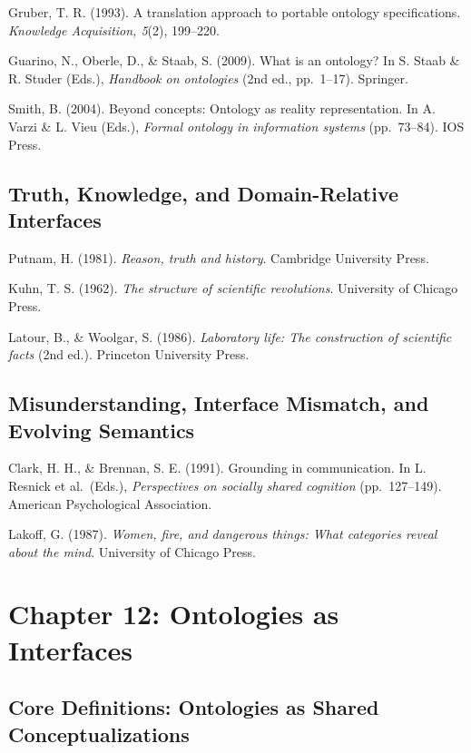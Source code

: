 \documentclass[
  openright]{book}
\begin{document}
Gruber, T. R. (1993). A translation approach to portable ontology
specifications. \emph{Knowledge Acquisition, 5}(2), 199--220.

Guarino, N., Oberle, D., \& Staab, S. (2009). What is an ontology? In S.
Staab \& R. Studer (Eds.), \emph{Handbook on ontologies} (2nd ed.,
pp.~1--17). Springer.

Smith, B. (2004). Beyond concepts: Ontology as reality representation.
In A. Varzi \& L. Vieu (Eds.), \emph{Formal ontology in information
systems} (pp.~73--84). IOS Press.

\subsection{Truth, Knowledge, and Domain-Relative
Interfaces}\label{truth-knowledge-and-domain-relative-interfaces-1}

Putnam, H. (1981). \emph{Reason, truth and history}. Cambridge
University Press.

Kuhn, T. S. (1962). \emph{The structure of scientific revolutions}.
University of Chicago Press.

Latour, B., \& Woolgar, S. (1986). \emph{Laboratory life: The
construction of scientific facts} (2nd ed.). Princeton University Press.

\subsection{Misunderstanding, Interface Mismatch, and Evolving
Semantics}\label{misunderstanding-interface-mismatch-and-evolving-semantics-1}

Clark, H. H., \& Brennan, S. E. (1991). Grounding in communication. In
L. Resnick et al.~(Eds.), \emph{Perspectives on socially shared
cognition} (pp.~127--149). American Psychological Association.

Lakoff, G. (1987). \emph{Women, fire, and dangerous things: What
categories reveal about the mind}. University of Chicago Press.

\section{Chapter 12: Ontologies as
Interfaces}\label{chapter-12-ontologies-as-interfaces-1}

\subsection{Core Definitions: Ontologies as Shared
Conceptualizations}\label{core-definitions-ontologies-as-shared-conceptualizations-1}
\end{document}
